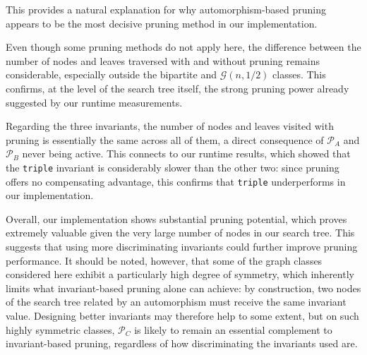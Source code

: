 This provides a natural explanation for why automorphism-based pruning appears to be the most decisive pruning method in our implementation.

Even though some pruning methods do not apply here, the difference between the number of nodes and leaves traversed with and without pruning remains considerable, especially outside the bipartite and $\mathcal{G}(n, 1/2)$ classes. This confirms, at the level of the search tree itself, the strong pruning power already suggested by our runtime measurements.

Regarding the three invariants, the number of nodes and leaves visited with pruning is essentially the same across all of them, a direct consequence of $\mathcal{P}_A$ and $\mathcal{P}_B$ never being active. This connects to our runtime results, which showed that the \texttt{triple} invariant is considerably slower than the other two: since pruning offers no compensating advantage, this confirms that \texttt{triple} underperforms in our implementation.

Overall, our implementation shows substantial pruning potential, which proves extremely valuable given the very large number of nodes in our search tree. This suggests that using more discriminating invariants could further improve pruning performance. It should be noted, however, that some of the graph classes considered here exhibit a particularly high degree of symmetry, which inherently limits what invariant-based pruning alone can achieve: by construction, two nodes of the search tree related by an automorphism must receive the same invariant value. Designing better invariants may therefore help to some extent, but on such highly symmetric classes, $\mathcal{P}_C$ is likely to remain an essential complement to invariant-based pruning, regardless of how discriminating the invariants used are.